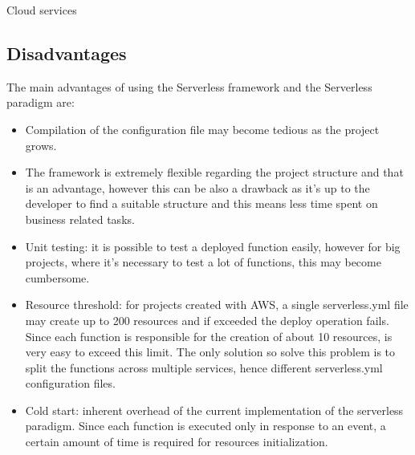 \begin{chapter}{Cloud services}
    \subsection{Disadvantages}
    \label{subsec:sls_disadvantage}
    The main advantages of using the Serverless framework and the Serverless paradigm are:
    \begin{itemize}
        \item Compilation of the configuration file may become tedious as the project grows.
        \item The framework is extremely flexible regarding the project structure and
            that is an advantage, however this can be also a drawback as it's up to the
            developer to find a suitable structure and this means less time spent on
            business related tasks.
        \item Unit testing: it is possible to test a deployed function easily, however
            for big projects, where it's necessary to test a lot of functions, this may
            become cumbersome.
        \item Resource threshold: for projects created with AWS, a single
            serverless.yml file may create up to 200 resources and if exceeded
            the deploy operation fails. Since each function is responsible for the
            creation of about 10 resources, is very easy to exceed this limit.
            The only solution so solve this problem is to split the functions across
            multiple services, hence different serverless.yml configuration files.
        \item Cold start: inherent overhead of the current implementation of the
            serverless paradigm. Since each function is executed only in response to
            an event, a certain amount of time is required for resources initialization.
    \end{itemize}


\end{chapter}
